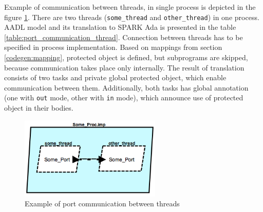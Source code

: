 Example of communication between threads, in single process is depicted in the figure \ref{figure:port_communication_thread}. There are two threads (\lstinline{some_thread} and \lstinline{other_thread}) in one process. AADL model and its translation to SPARK Ada is presented in the table \ref{table:port_communication_thread}. Connection between threads has to be specified in process implementation. Based on mappings from section \ref{codegen:mapping}, protected object is defined, but subprograms are skipped, because communication takes place only internally. The result of translation consists of two tasks and private global protected object, which enable communication between them. Additionally, both tasks has global annotation (one with \lstinline{out} mode, other with \lstinline{in} mode), which announce use of protected object in their bodies.

\begin{figure}[ht]%
    \begin{center}
    	\includegraphics[width=0.6\textwidth]{figures/port-communication-thread.png}    	
    \end{center}
    \caption{Example of port communication between threads}
    \label{figure:port_communication_thread}
\end{figure}

